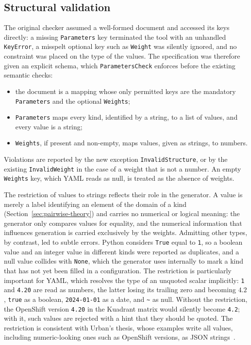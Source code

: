 \documentclass[
  digital, %
  oneside, %
  lof,     %
  nolot,     %
]{fithesis4}
\begin{document}
\subsection{Structural validation}
\label{sec:formats-validation}
The original checker assumed a well-formed document and accessed its keys
directly: a missing \texttt{Parameters} key terminated the tool with an
unhandled \texttt{KeyError}, a misspelt optional key such as \texttt{Weight} was
silently ignored, and no constraint was placed on the type of the values. The
specification was therefore given an explicit schema, which
\texttt{ParametersCheck} enforces before the existing semantic checks:
%
\begin{itemize}
  \item the document is a mapping whose only permitted keys are the mandatory
        \texttt{Parameters} and the optional \texttt{Weights};
  \item \texttt{Parameters} maps every kind, identified by a string, to a list
        of values, and every value is a string;
  \item \texttt{Weights}, if present and non-empty, maps values, given as
        strings, to numbers.
\end{itemize}
%
Violations are reported by the new exception \texttt{InvalidStructure}, or by
the existing \texttt{InvalidWeight} in the case of a weight that is not a number.
An empty \texttt{Weights} key, which \gls{YAML} reads as null, is treated as the
absence of weights.

The restriction of values to strings reflects their role in the generator. A
value is merely a label identifying an element of the domain of a kind
(Section~\ref{sec:pairwise-theory}) and carries no numerical or logical meaning:
the generator only compares values for equality, and the numerical information
that influences generation is carried exclusively by the weights. Admitting
other types, by contrast, led to subtle errors. Python considers \texttt{True}
equal to \texttt{1}, so a boolean value and an integer value in different kinds
were reported as duplicates, and a null value collides with \texttt{None}, which
the generator uses internally to mark a kind that has not yet been filled in a
configuration. The restriction is particularly important for \gls{YAML}, which
resolves the type of an unquoted scalar implicitly: \texttt{1} and \texttt{4.20}
are read as numbers, the latter losing its trailing zero and becoming $4.2$,
\texttt{true} as a boolean, \texttt{2024-01-01} as a date, and
\texttt{\textasciitilde} as null. Without the restriction, the OpenShift version
\texttt{4.20} in the Kuadrant matrix would silently become \texttt{4.2}; with
it, such values are rejected with a hint that they should be quoted. The
restriction is consistent with Urban's thesis, whose examples write all values,
including numeric-looking ones such as OpenShift versions, as \gls{JSON}
strings~\cite[pp.~24, 31]{Urban2024thesis}.
\end{document}
